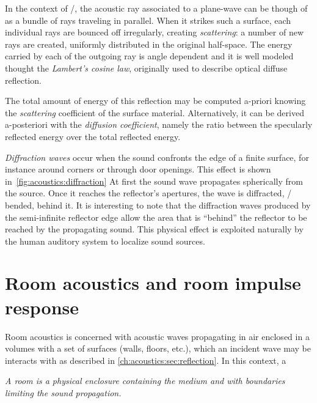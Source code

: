 In the context of \GA/, the acoustic ray associated to a plane-wave can be though of as a bundle of rays traveling in parallel.
When it strikes such a surface, each individual rays are bounced off irregularly, creating \textit{scattering}:
a number of new rays are created, uniformly distributed in the original half-space.
The energy carried by each of the outgoing ray is angle dependent and it
is well modeled thought the \textit{Lambert's cosine law}, originally used to describe optical diffuse reflection.

The total amount of energy of this reflection may be computed a-priori
knowing the \textit{scattering} coefficient of the surface material.
Alternatively, it can be derived a-posteriori with the \textit{diffusion coefficient}, namely the ratio between
the specularly reflected energy over the total reflected energy.

\textit{Diffraction waves} occur when the sound confronts the edge of a finite surface, for instance around corners or through door openings.
This effect is shown in~\cref{fig:acoustics:diffraction}
At first the sound wave propagates spherically from the source.
Once it reaches the reflector's  apertures, the wave is diffracted, \ie/ bended, behind it.
It is interesting to note that the diffraction waves produced by the semi-infinite reflector edge
allow the area that is ``behind'' the reflector to be reached by the propagating sound.
This physical effect is exploited naturally by the human auditory system to localize sound sources.


\section{Room acoustics and room impulse response}\label{ch:acoustics:sec:rir}
Room acoustics is concerned with acoustic waves propagating in air enclosed in a volumes with a set of surfaces
(walls, floors, etc.), which an incident wave may be interacts with as described in \cref{ch:acoustics:sec:reflection}.
In this context, a
\begin{center}
    \textit{A room is a physical enclosure containing the medium and with boundaries limiting the sound propagation.}
\end{center}

